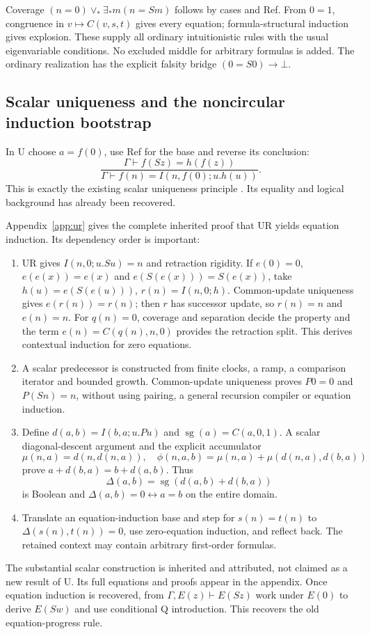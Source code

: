 Coverage $(n=0)\vee_*\exists_*m(n=Sm)$ follows by cases and Ref.
From $0=1$, congruence in $v\mapsto C(v,s,t)$ gives every equation;
formula-structural induction gives explosion. These supply all ordinary
intuitionistic rules with the usual eigenvariable conditions.
No excluded middle for arbitrary formulas is added. The ordinary
realization has the explicit falsity bridge $(0=S0)\to\bot$.

\subsection{Scalar uniqueness and the noncircular induction bootstrap}
In U choose $a=f(0)$, use Ref for the base and reverse its conclusion:
\[
 \frac{\Gamma\vdash f(Sz)=h(f(z))}
      {\Gamma\vdash f(n)=I(n,f(0);u.h(u))}.                \tag{UR}\label{eq:ur}
\]
This is exactly the existing scalar uniqueness principle \cite{ur}.
Its equality and logical background has already been recovered.

Appendix~\ref{app:ur} gives the complete inherited proof that UR yields
equation induction. Its dependency order is important:
\begin{enumerate}
\item UR gives $I(n,0;u.Su)=n$ and retraction rigidity. If
$e(0)=0$, $e(e(x))=e(x)$ and $e(S(e(x)))=S(e(x))$, take
$h(u)=e(S(e(u)))$, $r(n)=I(n,0;h)$. Common-update uniqueness gives
$e(r(n))=r(n)$; then $r$ has successor update, so $r(n)=n$ and $e(n)=n$.
For $q(n)=0$, coverage and separation decide the property and the term
$e(n)=C(q(n),n,0)$ provides the retraction split. This derives contextual
induction for zero equations.
\item A scalar predecessor is constructed from finite clocks, a ramp, a
comparison iterator and bounded growth. Common-update uniqueness proves
$P0=0$ and $P(Sn)=n$, without using pairing, a general recursion compiler
or equation induction.
\item Define $d(a,b)=I(b,a;u.Pu)$ and
$\operatorname{sg}(a)=C(a,0,1)$. A scalar diagonal-descent argument and the
explicit accumulator
\[
 \mu(n,a)=d(n,d(n,a)),\quad
 \phi(n,a,b)=\mu(n,a)+\mu(d(n,a),d(b,a))
\]
prove $a+d(b,a)=b+d(a,b)$. Thus
\[
 \Delta(a,b)=\operatorname{sg}(d(a,b)+d(b,a))
\]
is Boolean and $\Delta(a,b)=0\leftrightarrow a=b$ on the entire domain.
\item Translate an equation-induction base and step for $s(n)=t(n)$ to
$\Delta(s(n),t(n))=0$, use zero-equation induction, and reflect back.
The retained context may contain arbitrary first-order formulas.
\end{enumerate}
The substantial scalar construction is inherited and attributed, not
claimed as a new result of U. Its full equations and proofs appear in
the appendix. Once equation induction is recovered, from
$\Gamma,E(z)\vdash E(Sz)$ work under $E(0)$ to derive $E(Sw)$ and use
conditional Q introduction. This recovers the old equation-progress rule.


